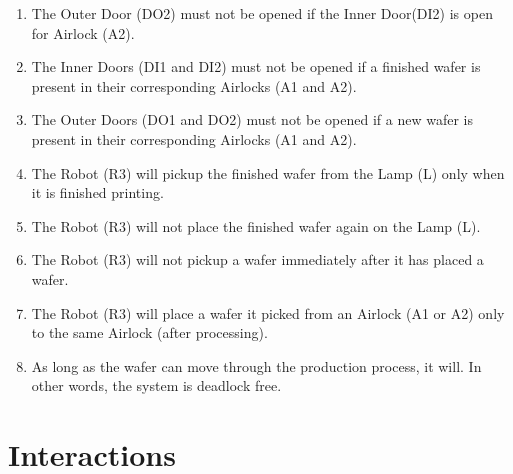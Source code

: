 \documentclass[a4paper,12pt]{article}
\begin{document}
\begin{enumerate}
		\item The Outer Door (DO2) must not be opened if the Inner Door(DI2) is open for Airlock (A2).
		
		\item The Inner Doors (DI1 and DI2) must not be opened if a finished wafer is present in their corresponding Airlocks (A1 and A2).
		
		\item The Outer Doors (DO1 and DO2) must not be opened if a new wafer is present in their corresponding Airlocks (A1 and A2).
		
		\item The Robot (R3) will pickup the finished wafer from the Lamp (L) only when it is finished printing.
		
		\item The Robot (R3) will not place the finished wafer again on the Lamp (L).
		
		\item The Robot (R3) will not pickup a wafer immediately after it has placed a wafer.
		
		\item The Robot (R3) will place a wafer it picked from an Airlock (A1 or A2) only to the same Airlock (after processing). 
		
		\item As long as the wafer can move through the production process, it will. In other words, the system is deadlock free.
		
	\end{enumerate}
	
	\newpage
	\section{Interactions} 
\end{document}
